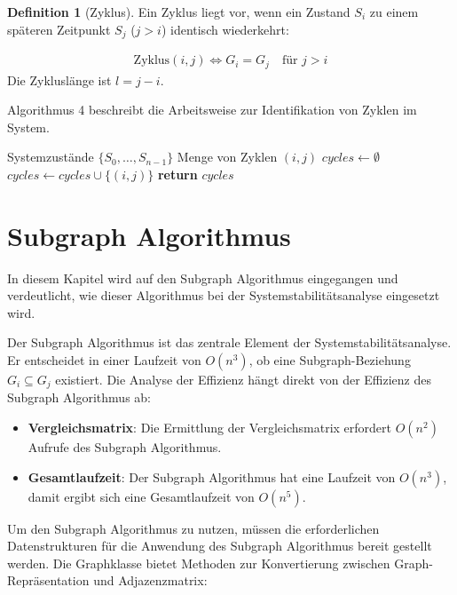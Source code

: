 \documentclass[a4paper,12pt]{article}
\theoremstyle{definition}
\newtheorem{definition}{Definition}
\begin{document}
\begin{definition}[Zyklus]
Ein Zyklus liegt vor, wenn ein Zustand $S_i$ zu einem späteren Zeitpunkt $S_j$ ($j > i$) identisch wiederkehrt:

\begin{align}
	\text{Zyklus}(i, j) \Leftrightarrow G_i = G_j \quad \text{für } j > i
\end{align}
Die Zykluslänge ist $l = j - i$.
\end{definition}
Algorithmus 4 beschreibt die Arbeitsweise zur Identifikation von Zyklen im System.

\begin{algorithm}[H]
	\caption{Identifikation von Zyklen}
	\begin{algorithmic}[1]
		\Require Systemzustände $\{S_0, \ldots, S_{n-1}\}$
		\Ensure Menge von Zyklen $(i, j)$
		\State $cycles \gets \emptyset$
		 
		\State $cycles \gets cycles \cup \{(i, j)\}$
		\EndIf
		\EndFor
		\EndFor
		\State \textbf{return} $cycles$
	\end{algorithmic}
\end{algorithm}

\section{Subgraph Algorithmus}
\label{sec:sa}

In diesem Kapitel wird auf den Subgraph Algorithmus eingegangen und verdeutlicht, wie dieser Algorithmus bei der Systemstabilitätsanalyse eingesetzt wird. 

Der Subgraph Algorithmus ist das zentrale Element der Systemstabilitätsanalyse. Er entscheidet in einer Laufzeit von $O(n^3)$, ob eine Subgraph-Beziehung $G_i \subseteq G_j$ existiert. Die Analyse der Effizienz hängt direkt von der Effizienz des Subgraph Algorithmus ab:
\begin{itemize}
	\item[-] \textbf{Vergleichsmatrix}: Die Ermittlung der Vergleichsmatrix erfordert $O(n^2)$ Aufrufe des Subgraph Algorithmus.
	\item[-] \textbf{Gesamtlaufzeit}: Der Subgraph Algorithmus hat eine Laufzeit von $O(n^3)$, damit ergibt sich eine Gesamtlaufzeit von $O(n^5)$.
\end{itemize}
Um den Subgraph Algorithmus zu nutzen, müssen die erforderlichen Datenstrukturen für die Anwendung des Subgraph Algorithmus bereit gestellt werden. Die Graphklasse bietet Methoden zur Konvertierung zwischen Graph-Repräsentation und Adjazenzmatrix:
\end{document}
